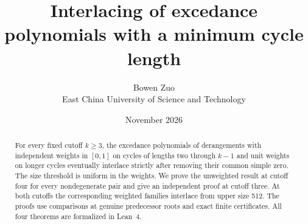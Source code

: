 \documentclass[11pt]{article}
\title{Interlacing of excedance polynomials with a minimum cycle length}
\author{Bowen Zuo\\[2pt]\small East China University of Science and Technology}
\date{November 2026}
\begin{document}
\maketitle
\begin{abstract}
For every fixed cutoff \(k\ge3\), the excedance polynomials of derangements with independent weights in \([0,1]\) on cycles of lengths two through \(k-1\) and unit weights on longer cycles eventually interlace strictly after removing their common simple zero. The size threshold is uniform in the weights. We prove the unweighted result at cutoff four for every nondegenerate pair and give an independent proof at cutoff three. At both cutoffs the corresponding weighted families interlace from upper size 512. The proofs use comparisons at genuine predecessor roots and exact finite certificates. All four theorems are formalized in Lean~4.
\end{abstract}
\end{document}
